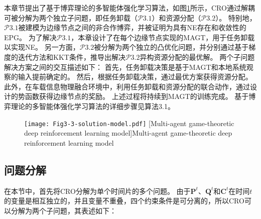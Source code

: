 本章节提出了基于博弈理论的多智能体强化学习算法，如图\ref{fig 3-3}所示，CRO通过解耦可被分解为两个独立子问题，即任务卸载（$\mathcal{P}3.1$）和资源分配（$\mathcal{P}3.2$）。
特别地，$\mathcal{P}3.1$被建模为边缘节点之间的非合作博弈，并被证明为具有NE存在和收敛性的EPG。
为了解决$\mathcal{P}3.1$，本章设计了在每个边缘节点实现的MAGT，用于任务卸载以实现NE。
另一方面，$\mathcal{P}3.2$被分解为两个独立的凸优化问题，并分别通过基于梯度的迭代方法和KKT条件，推导出解决$\mathcal{P}3.2$异构资源分配的最优解。
两个子问题解决方案之间的交互描述如下：
首先，任务卸载决策是基于MAGT和本地系统观察的输入提前确定的。
然后，根据任务卸载决策，通过最优方案获得资源分配。
此外，在车载信息物理融合环境中，利用任务卸载和资源分配的联合动作，通过设计的势函数获得边缘节点的奖励。
上述过程将持续到MAGT的训练完成。
基于博弈理论的多智能体强化学习算法的详细步骤见算法3.1。

\begin{figure}[h]
\centering
  \texttt{[image: Fig3-3-solution-model.pdf]}
  [Multi-agent game-theoretic deep reinforcement learning model]{Multi-agent game-theoretic deep reinforcement learning model}
  \label{fig 3-3}
\end{figure} 

\subsection[\hspace{-2pt}问题分解]{{ \hspace{-8pt}问题分解}}

在本节中，首先将CRO分解为单个时间片的多个问题。
由于$\mathbf{P}^{t}$、$\mathbf{Q}^{t}$和$\mathbf{C}^{t}$在时间$t$的变量是相互独立的，并且变量不重叠，四个约束条件是可分离的，所以CRO可以分解为两个子问题，其表述如下：


